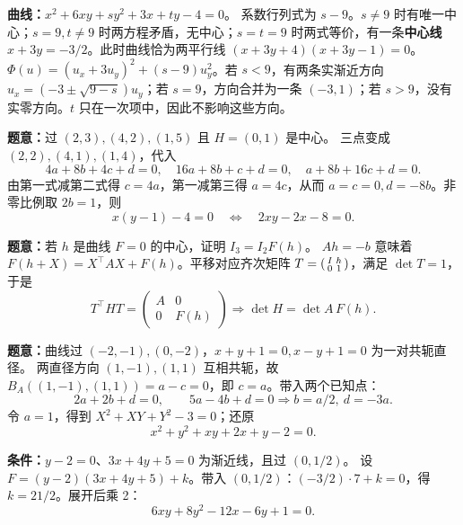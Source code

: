 \textbf{曲线：}$x^2+6xy+sy^2+3x+ty-4=0$。
 系数行列式为 $s-9$。$s\ne9$ 时有唯一中心；$s=9,t\ne9$ 时两方程矛盾，无中心；$s=t=9$ 时两式等价，有一条\textbf{中心线} $x+3y=-3/2$。此时曲线恰为两平行线 $(x+3y+4)(x+3y-1)=0$。
 $\Phi(u)=(u_x+3u_y)^2+(s-9)u_y^2$。若 $s<9$，有两条实渐近方向 $u_x=(-3\pm\sqrt{9-s})u_y$；若 $s=9$，方向合并为一条 $(-3,1)$；若 $s>9$，没有实零方向。$t$ 只在一次项中，因此不影响这些方向。

\textbf{题意：}过 $(2,3),(4,2),(1,5)$ 且 $H=(0,1)$ 是中心。
三点变成 $(2,2),(4,1),(1,4)$，代入
\[
4a+8b+4c+d=0,\quad16a+8b+c+d=0,\quad a+8b+16c+d=0.
\]
由第一式减第二式得 $c=4a$，第一减第三得 $a=4c$，从而 $a=c=0,d=-8b$。非零比例取 $2b=1$，则
\[\boxed{x(y-1)-4=0\quad\Longleftrightarrow\quad2xy-2x-8=0.}\]

\textbf{题意：}若 $h$ 是曲线 $F=0$ 的中心，证明 $I_3=I_2F(h)$。
$Ah=-b$ 意味着 $F(h+X)=X^\top AX+F(h)$。平移对应齐次矩阵 $T=\begin{psmallmatrix}I&h\\0&1\end{psmallmatrix}$，满足 $\det T=1$，于是
\[
T^\top H T=\begin{pmatrix}A&0\\0&F(h)\end{pmatrix}
\Longrightarrow \det H=\det A\,F(h).
\]

\textbf{题意：}曲线过 $(-2,-1),(0,-2)$，$x+y+1=0,x-y+1=0$ 为一对共轭直径。
两直径方向 $(1,-1),(1,1)$ 互相共轭，故 $B_A((1,-1),(1,1))=a-c=0$，即 $c=a$。带入两个已知点：
\[
2a+2b+d=0,\qquad5a-4b+d=0
\Longrightarrow b=a/2,\ d=-3a.
\]
令 $a=1$，得到 $X^2+XY+Y^2-3=0$；还原
\[\boxed{x^2+y^2+xy+2x+y-2=0.}\]

\textbf{条件：}$y-2=0$、$3x+4y+5=0$ 为渐近线，且过 $(0,1/2)$。
设 $F=(y-2)(3x+4y+5)+k$。带入 $(0,1/2)$：$(-3/2)\cdot7+k=0$，得 $k=21/2$。展开后乘 2：
\[\boxed{6xy+8y^2-12x-6y+1=0.}\]

